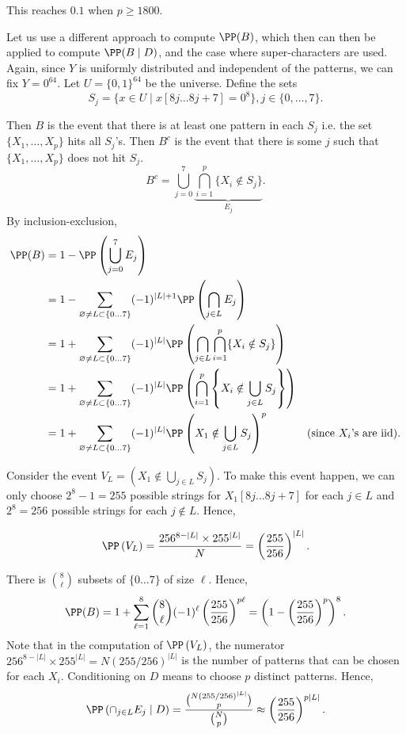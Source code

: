This reaches $0.1$ when $p\ge 1800$.

Let us use a different approach to compute $\PP(B)$, which then can then be applied to compute $\PP(B\mid D)$, and the case where super-characters are used. Again, since $Y$ is uniformly distributed and independent of the patterns, we can fix $Y=0^{64}$. Let $U=\{0,1\}^{64}$ be the universe. Define the sets
$$S_j=\{x\in U \mid x[8j\ldots 8j+7] = 0^8\}, j\in\{0,\ldots, 7\}.$$

Then $B$ is the event that there is at least one pattern in each $S_j$ i.e. the set $\{X_1,\ldots,X_p\}$ hits all $S_j$'s. Then $B^c$ is the event that there is some $j$ such that $\{X_1,\ldots,X_p\}$ does not hit $S_j$.
$$B^c = \bigcup_{j=0}^7 \underbrace{\bigcap_{i=1}^p \{X_i\notin S_j\}}_{E_j}.$$
By inclusion-exclusion,
\begin{align*}
  \PP(B)
   & = 1-\PP\left(\bigcup_{j=0}^7 E_j\right)                                                                                                                                         \\
   & = 1-\sum_{\varnothing\ne L \subset \{0\ldots 7\}} (-1)^{|L|+1}\PP\left(\bigcap_{j\in L} E_j\right)                                                                              \\
   & = 1+\sum_{\varnothing\ne L \subset \{0\ldots 7\}} (-1)^{|L|}\PP\left(\bigcap_{j\in L}\bigcap_{i=1}^p \{X_i\notin S_j\}\right)                                                   \\
   & = 1+\sum_{\varnothing\ne L \subset \{0\ldots 7\}} (-1)^{|L|}\PP\left(\bigcap_{i=1}^p \left\{X_i\notin \bigcup_{j\in L}S_j\right\}\right)                                        \\
   & = 1+\sum_{\varnothing\ne L \subset \{0\ldots 7\}} (-1)^{|L|}\PP\left(X_1\notin \bigcup_{j\in L} S_j\right)^p                             & (\text{since }X_i\text{'s are iid}).
\end{align*}

Consider the event $V_L = (X_1\notin \bigcup_{j\in L} S_j)$. To make this event happen, we can only choose $2^8-1=255$ possible strings for $X_1[8j\ldots 8j+7]$ for each $j\in L$ and $2^8=256$ possible strings for each $j\notin L$. Hence,

$$\PP\left(V_L\right) = \dfrac{256^{8-|L|}\times 255^{|L|}}{N} = \left(\dfrac{255}{256}\right)^{|L|}.$$

There is $\binom{8}{\ell}$ subsets of $\{0\ldots 7\}$ of size $\ell$. Hence,
$$\PP(B)=1+\sum\limits_{\ell=1}^8 \binom{8}{\ell} (-1)^{\ell} \left(\dfrac{255}{256}\right)^{p\ell}=\left(1-\left(\dfrac{255}{256}\right)^p\right)^8.$$
Note that in the computation of $\PP\left(V_L\right)$, the numerator $256^{8-|L|}\times 255^{|L|}=N\left(255/256\right)^{|L|}$ is the number of patterns that can be chosen for each $X_i$. Conditioning on $D$ means to choose $p$ distinct patterns. Hence,
$$\PP\left(\cap_{j\in L} E_j\mid D\right) = \dfrac{\binom{N\left(255/256\right)^{|L|}}{p}}{\binom{N}{p}} \approx \left(\dfrac{255}{256}\right)^{p|L|}.$$

